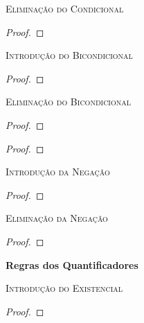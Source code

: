 \pagebreak
\textsc{Eliminação do Condicional}

\begin{proof}
	 
\end{proof}

\textsc{Introdução do Bicondicional}

\begin{proof}
	\open
		 
	\close
	\open
		 
	\close
\end{proof}

\textsc{Eliminação do Bicondicional}

\begin{proof}
	 
\end{proof}

\begin{proof}
	 
\end{proof}



\textsc{Introdução da Negação}

\begin{proof}
	\open
		 
	\close
\end{proof}

\textsc{Eliminação da Negação}

\begin{proof}
	\open
		 
	\close
\end{proof}








\newpage

{\LARGE \bf Regras dos Quantificadores}

\textsc{Introdução do Existencial}

\begin{proof}
	 
\end{proof}

